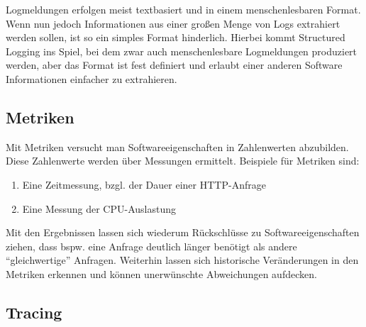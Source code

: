 %

Logmeldungen erfolgen meist textbasiert und in einem menschenlesbaren Format. Wenn nun jedoch Informationen aus einer großen Menge von Logs extrahiert werden sollen, ist so ein simples Format hinderlich. Hierbei kommt Structured Logging ins Spiel, bei dem zwar auch menschenlesbare Logmeldungen produziert werden, aber das Format ist fest definiert und erlaubt einer anderen Software Informationen einfacher zu extrahieren.

\subsection{Metriken}

Mit Metriken versucht man Softwareeigenschaften in Zahlenwerten abzubilden. Diese Zahlenwerte werden über Messungen ermittelt. Beispiele für Metriken sind:

\begin{enumerate}
	\item Eine Zeitmessung, bzgl. der Dauer einer HTTP-Anfrage
	\item Eine Messung der CPU-Auslastung
\end{enumerate}


Mit den Ergebnissen lassen sich wiederum Rückschlüsse zu Softwareeigenschaften ziehen, dass bspw. eine Anfrage deutlich länger benötigt als andere \enquote{gleichwertige} Anfragen. Weiterhin lassen sich historische Veränderungen in den Metriken erkennen und können unerwünschte Abweichungen aufdecken.

\subsection{Tracing}
\label{sec:tracing}

